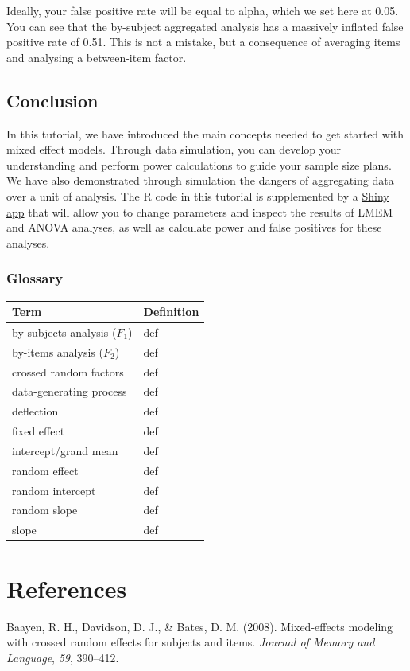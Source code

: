\documentclass[man,floatsintext]{apa6}
\begin{document}
Ideally, your false positive rate will be equal to alpha, which we set
here at 0.05. You can see that the by-subject aggregated analysis has a
massively inflated false positive rate of 0.51. This is not a mistake,
but a consequence of averaging items and analysing a between-item
factor.

\subsection{Conclusion}\label{conclusion}

In this tutorial, we have introduced the main concepts needed to get
started with mixed effect models. Through data simulation, you can
develop your understanding and perform power calculations to guide your
sample size plans. We have also demonstrated through simulation the
dangers of aggregating data over a unit of analysis. The R code in this
tutorial is supplemented by a
\href{http://shiny.psy.gla.ac.uk/lmem/}{Shiny app} that will allow you
to change parameters and inspect the results of LMEM and ANOVA analyses,
as well as calculate power and false positives for these analyses.

\subsubsection{Glossary}\label{glossary}

\begin{longtable}[]{@{}ll@{}}
\toprule
Term & Definition\tabularnewline
\midrule
\endhead
by-subjects analysis (\(F_1\)) & def\tabularnewline
by-items analysis (\(F_2\)) & def\tabularnewline
crossed random factors & def\tabularnewline
data-generating process & def\tabularnewline
deflection & def\tabularnewline
fixed effect & def\tabularnewline
intercept/grand mean & def\tabularnewline
random effect & def\tabularnewline
random intercept & def\tabularnewline
random slope & def\tabularnewline
slope & def\tabularnewline
\bottomrule
\end{longtable}

\newpage

\section{References}\label{references}

\begingroup
\setlength{\parindent}{-0.5in} \setlength{\leftskip}{0.5in}

\hypertarget{refs}{}
\hypertarget{ref-baayen_davidson_bates_2008}{}
Baayen, R. H., Davidson, D. J., \& Bates, D. M. (2008). Mixed-effects
modeling with crossed random effects for subjects and items.
\emph{Journal of Memory and Language}, \emph{59}, 390--412.
\end{document}
